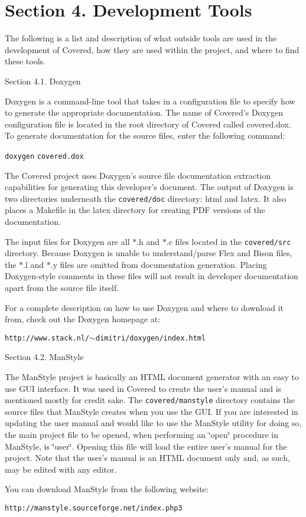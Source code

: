 \section{Section 4.  Development Tools}\label{page_tools}
 

 The following is a list and description of what outside tools are used in the development of Covered, how they are used within the project, and where to find these tools.\begin{Desc}
\item[Section 4.1.  Doxygen]\par
 Doxygen is a command-line tool that takes in a configuration file to specify how to generate the appropriate documentation. The name of Covered's Doxygen configuration file is located in the root directory of Covered called covered.dox. To generate documentation for the source files, enter the following command:

 {\tt doxygen} {\tt covered.dox}

 The Covered project uses Doxygen's source file documentation extraction capabilities for generating this developer's document. The output of Doxygen is two directories underneath the {\tt covered/doc} directory: html and latex. It also places a Makefile in the latex directory for creating PDF versions of the documentation.

 The input files for Doxygen are all $\ast$.h and $\ast$.c files located in the {\tt covered/src} directory. Because Doxygen is unable to understand/parse Flex and Bison files, the $\ast$.l and $\ast$.y files are omitted from documentation generation. Placing Doxygen-style comments in these files will not result in developer documentation apart from the source file itself.

 For a complete description on how to use Doxygen and where to download it from, check out the Doxygen homepage at:

 {\tt http://www.stack.nl/$\sim$dimitri/doxygen/index.html}\end{Desc}


\begin{Desc}
\item[Section 4.2.  Man\-Style]\par
 The Man\-Style project is basically an HTML document generator with an easy to use GUI  interface. It was used in Covered to create the user's manual and is mentioned mostly for credit sake. The {\tt covered/manstyle} directory contains the source files that Man\-Style creates when you use the GUI. If you are interested in updating the user manual and would like to use the Man\-Style utility for doing so, the main project file to be opened, when performing an \char`\"{}open\char`\"{} procedure in Man\-Style, is \char`\"{}user\char`\"{}. Opening this file will load the entire user's manual for the project. Note that the user's manual is an HTML document only and, as such, may be edited with any editor.

 You can download Man\-Style from the following website:

 {\tt http://manstyle.sourceforge.net/index.php3}\end{Desc}


